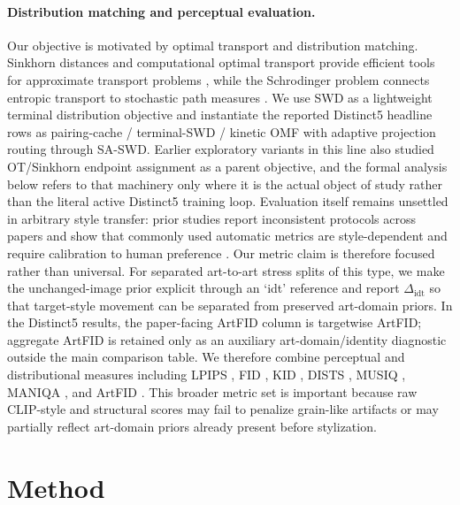 \documentclass[letterpaper]{article}
\begin{document}
\paragraph{Distribution matching and perceptual evaluation.}
Our objective is motivated by optimal transport and distribution matching. Sinkhorn distances and computational optimal transport provide efficient tools for approximate transport problems \cite{cuturi2013sinkhorn,peyre2019computational}, while the Schrodinger problem connects entropic transport to stochastic path measures \cite{leonard2014survey}. We use SWD as a lightweight terminal distribution objective and instantiate the reported Distinct5 headline rows as pairing-cache / terminal-SWD / kinetic OMF with adaptive projection routing through SA-SWD. Earlier exploratory variants in this line also studied OT/Sinkhorn endpoint assignment as a parent objective, and the formal analysis below refers to that machinery only where it is the actual object of study rather than the literal active Distinct5 training loop. Evaluation itself remains unsettled in arbitrary style transfer: prior studies report inconsistent protocols across papers and show that commonly used automatic metrics are style-dependent and require calibration to human preference \cite{zhou2024comprehensiveeval,yeh2020calibrated,wright2022artfid}. Our metric claim is therefore focused rather than universal. For separated art-to-art stress splits of this type, we make the unchanged-image prior explicit through an `idt' reference and report $\Delta_{\mathrm{idt}}$ so that target-style movement can be separated from preserved art-domain priors. In the Distinct5 results, the paper-facing ArtFID column is targetwise ArtFID; aggregate ArtFID is retained only as an auxiliary art-domain/identity diagnostic outside the main comparison table. We therefore combine perceptual and distributional measures including LPIPS \cite{zhang2018lpips}, FID \cite{heusel2017fid}, KID \cite{binkowski2018kid}, DISTS \cite{ding2020dists}, MUSIQ \cite{ke2021musiq}, MANIQA \cite{yang2022maniqa}, and ArtFID \cite{wright2022artfid}. This broader metric set is important because raw CLIP-style and structural scores may fail to penalize grain-like artifacts or may partially reflect art-domain priors already present before stylization.

\section{Method}
\end{document}
